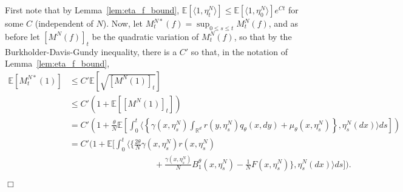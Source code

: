 \documentclass[12pt]{article}
\newenvironment {proof}{{\noindent\bf Proof }}{\hfill $\Box$ \medskip}
\newcommand{\IE}{\mathbb E}
\newcommand{\IR}{\mathbb R}
\numberwithin{equation}{section}
\begin{document}
\begin{proof}
    First note that by Lemma~\ref{lem:eta_f_bound},
    $\IE[\langle 1, \eta^N_t \rangle] \le \IE[\langle 1, \eta^N_0 \rangle] e^{Ct}$
    for some $C$ (independent of $N$).
    Now, let $M^{N*}_t(f) = \sup_{0 \le s \le t} M^N_t(f)$,
    and as before let $[M^N(f)]_t$ be the quadratic variation of $M^N_t(f)$,
    so that by the Burkholder-Davis-Gundy inequality, there is a $C'$ so that,
    in the notation of Lemma~\ref{lem:eta_f_bound},
    \begin{align*}
        \IE\left[ M^{N*}_t(1) \right]
        &\le
        C' \IE\left[ \sqrt{[M^N(1)]_t} \right]
        \\ &\le
        C'\left( 1 + \IE\left[ [M^N(1)]_t \right] \right)
        \\ &=
        C'\left( 1 + \frac{\theta}{N} \IE\left[
            \int_0^t
	    \Big\langle\left\{
                \gamma(x, \eta^N_s)
                \int_{\IR^d} r(y, \eta^N_s) q_\theta(x, dy)
                + \mu_\theta(x, \eta^N_s)
            \right\}, \eta_s^N(dx)\Big\rangle
            ds
            \right] \right)
        \\ &=
        C'\Big( 1 + \IE\Big[
            \int_0^t
	    \Big\langle\Big\{
                \frac{2\theta}{N} \gamma(x, \eta^N_s) r(x, \eta^N_s)
        \\ &\qquad\qquad\qquad\qquad \qquad {}
		+ \frac{\gamma(x,\eta_s^N)}{N} 
		B^\theta_1(x, \eta^N_s)-\frac{1}{N}F(x,\eta^N_s)
            \Big\}, \eta_s^N(dx) \Big\rangle
            ds
            \Big] \Big) .
    \end{align*}


\end{proof}
\end{document}
